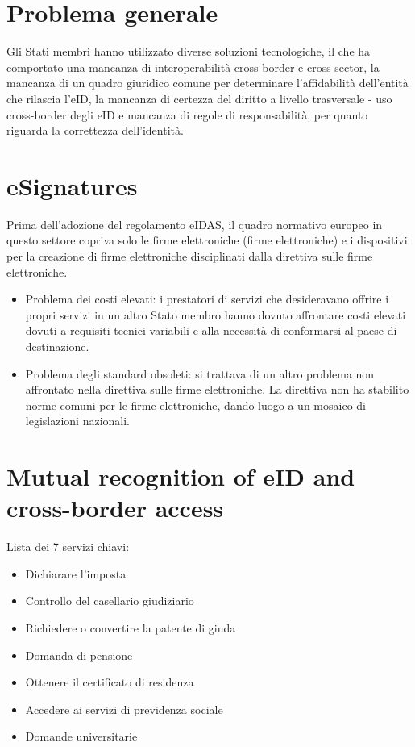 \section{Problema generale}
Gli Stati membri hanno utilizzato diverse soluzioni tecnologiche, il che ha comportato una mancanza di interoperabilità cross-border e cross-sector, la mancanza di un quadro giuridico comune per determinare l'affidabilità dell'entità che rilascia l'eID, la mancanza di certezza del diritto a livello trasversale - uso cross-border degli eID e mancanza di regole di responsabilità, per quanto riguarda la correttezza dell'identità.

\section{eSignatures}
Prima dell'adozione del regolamento eIDAS, il quadro normativo europeo in questo settore copriva solo le firme elettroniche (firme elettroniche) e i dispositivi per la creazione di firme elettroniche disciplinati dalla direttiva sulle firme elettroniche.

\begin{itemize}
    \item Problema dei costi elevati: i prestatori di servizi che desideravano offrire i propri servizi in un altro Stato membro hanno dovuto affrontare costi elevati dovuti a requisiti tecnici variabili e alla necessità di conformarsi al paese di destinazione.
    \item Problema degli standard obsoleti: si trattava di un altro problema non affrontato nella direttiva sulle firme elettroniche. La direttiva non ha stabilito norme comuni per le firme elettroniche, dando luogo a un mosaico di legislazioni nazionali.
    
\end{itemize}

\section{Mutual recognition of eID and cross-border access}
Lista dei 7 servizi chiavi:

\begin{itemize}
    \item Dichiarare l'imposta
    \item Controllo del casellario giudiziario
    \item Richiedere o convertire la patente di giuda
    \item Domanda di pensione
    \item Ottenere il certificato di residenza
    \item Accedere ai servizi di previdenza sociale
    \item Domande universitarie
\end{itemize}

